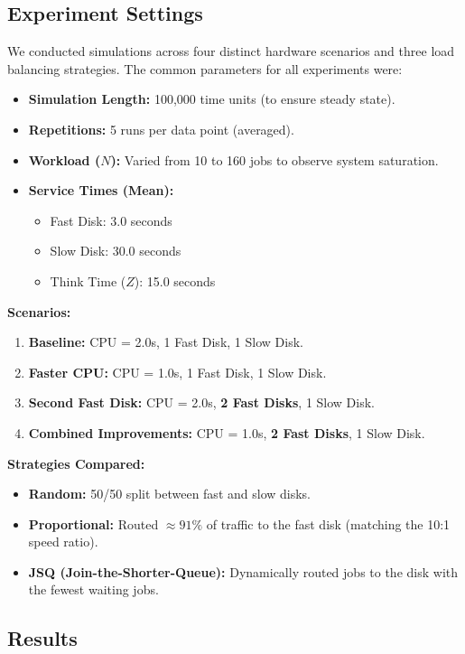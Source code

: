 \documentclass[a4paper,10pt]{article}
\begin{document}
\subsection{Experiment Settings}
We conducted simulations across four distinct hardware scenarios and three load balancing strategies. The common parameters for all experiments were:
\begin{itemize}
    \item \textbf{Simulation Length:} 100,000 time units (to ensure steady state).
    \item \textbf{Repetitions:} 5 runs per data point (averaged).
    \item \textbf{Workload ($N$):} Varied from 10 to 160 jobs to observe system saturation.
    \item \textbf{Service Times (Mean):}
    \begin{itemize}
        \item Fast Disk: 3.0 seconds
        \item Slow Disk: 30.0 seconds
        \item Think Time ($Z$): 15.0 seconds
    \end{itemize}
\end{itemize}

\textbf{Scenarios:}
\begin{enumerate}
    \item \textbf{Baseline:} CPU = 2.0s, 1 Fast Disk, 1 Slow Disk.
    \item \textbf{Faster CPU:} CPU = 1.0s, 1 Fast Disk, 1 Slow Disk.
    \item \textbf{Second Fast Disk:} CPU = 2.0s, \textbf{2 Fast Disks}, 1 Slow Disk.
    \item \textbf{Combined Improvements:} CPU = 1.0s, \textbf{2 Fast Disks}, 1 Slow Disk.
\end{enumerate}

\textbf{Strategies Compared:}
\begin{itemize}
    \item \textbf{Random:} 50/50 split between fast and slow disks.
    \item \textbf{Proportional:} Routed $\approx 91\%$ of traffic to the fast disk (matching the 10:1 speed ratio).
    \item \textbf{JSQ (Join-the-Shorter-Queue):} Dynamically routed jobs to the disk with the fewest waiting jobs.
\end{itemize}

\subsection{Results}
\end{document}
